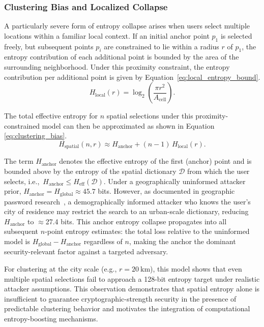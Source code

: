\documentclass[mathematics,article,accept,pdftex,moreauthors]{Definitions/mdpi}
\begin{document}
\subsubsection{Clustering Bias and Localized Collapse}
\label{sec:clustering}

A particularly severe form of entropy collapse arises when users select multiple locations within a familiar local context. If an initial anchor point $p_1$ is selected freely, but subsequent points $p_i$ are constrained to lie within a radius $r$ of $p_1$, the entropy contribution of each additional point is bounded by the area of the surrounding neighborhood. Under this proximity constraint, the entropy contribution per additional point is given by \mbox{Equation \eqref{eq:local_entropy_bound}}.
\begin{equation}
H_{\text{local}}(r) = \log_2\!\left(\frac{\pi r^2}{A_{\text{cell}}}\right).
\label{eq:local_entropy_bound}
\end{equation}

The total effective entropy for $n$ spatial selections under this proximity-constrained model can then be approximated as shown in Equation \eqref{eq:clustering_bias}.
\begin{equation}
H_{\text{spatial}}(n,r) \approx H_{\text{anchor}} + (n-1)\,H_{\text{local}}(r).
\label{eq:clustering_bias}
\end{equation}

{The term $H_{\text{anchor}}$ denotes the effective entropy of the first (anchor) point and is bounded above by the entropy of the spatial dictionary $\mathcal{D}$ from which the user selects, i.e.,\ $H_{\text{anchor}} \le H_{\text{eff}}(\mathcal{D})$. Under a geographically uninformed attacker prior, $H_{\text{anchor}} = H_{\text{global}} \approx 45.7$ bits. However, as documented in geographic password research~\cite{Sun2012, Thorpe2013, AlAmeen2014}, a demographically informed attacker who knows the user's city of residence may restrict the search to an urban-scale dictionary, reducing $H_{\text{anchor}}$ to $\approx$27.4 bits. This anchor entropy collapse propagates into all subsequent $n$-point entropy estimates: the total loss relative to the uninformed model is $H_{\text{global}} - H_{\text{anchor}}$ regardless of $n$, making the anchor the dominant security-relevant factor against a targeted adversary.}

For clustering at the city scale (e.g., $r = 20~\text{km}$), this model shows that even multiple spatial selections fail to approach a 128-bit entropy target under realistic attacker assumptions. This observation demonstrates that spatial entropy alone is insufficient to guarantee cryptographic-strength security in the presence of predictable clustering behavior and motivates the integration of computational entropy-boosting mechanisms.
\end{document}
